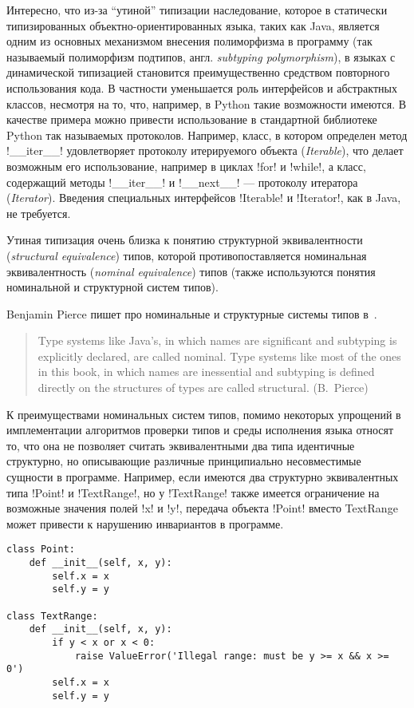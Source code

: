 Интересно, что из-за ``утиной'' типизации наследование, которое в статически
типизированных объектно-ориентированных языка, таких как Java, является
одним из основных механизмом внесения полиморфизма в программу (так называемый
полиморфизм подтипов, англ. \emph{subtyping polymorphism}),
в языках с динамической типизацией становится преимущественно средством
повторного использования кода. В частности уменьшается роль интерфейсов и
абстрактных классов, несмотря на то, что, например, в Python такие возможности
имеются. В качестве примера можно привести использование в
стандартной библиотеке Python так называемых протоколов. Например, класс, в
котором определен метод !__iter__! удовлетворяет протоколу
итерируемого объекта (\emph{Iterable}), что делает возможным его использование,
например в циклах !for! и !while!, а класс, содержащий методы
!__iter__! и !__next__! --- протоколу итератора
(\emph{Iterator}).  Введения специальных интерфейсов !Iterable!
и !Iterator!, как в Java, не требуется.

Утиная типизация очень близка к понятию структурной эквивалентности
(\emph{structural equivalence}) типов, которой противопоставляется номинальная
эквивалентность (\emph{nominal equivalence}) типов (также используются понятия
номинальной и структурной систем типов).

Benjamin Pierce пишет про номинальные и структурные системы типов в~\cite{Pierce2002}.

\begin{quote}
Type systems like Java’s, in which names are significant and subtyping is
explicitly declared, are called nominal. Type systems like most of the ones in
this book, in which names are inessential and subtyping is defined directly on
the structures of types are called structural.
(B.~Pierce)
\end{quote}

К преимуществами номинальных систем типов, помимо некоторых упрощений в
имплементации алгоритмов проверки типов и среды исполнения языка относят то,
что она не позволяет считать эквивалентными два типа идентичные структурно, но
описывающие различные принципиально несовместимые сущности в программе.
Например, если имеются два структурно эквивалентных типа !Point! и
!TextRange!, но у !TextRange! также имеется ограничение на
возможные значения полей !x! и !y!, передача объекта !Point! вместо
TextRange может привести к нарушению инвариантов в программе.

\begin{lstlisting}
class Point:
    def __init__(self, x, y):
        self.x = x
        self.y = y

class TextRange:
    def __init__(self, x, y):
        if y < x or x < 0:
            raise ValueError('Illegal range: must be y >= x && x >= 0')
        self.x = x
        self.y = y
\end{lstlisting}

